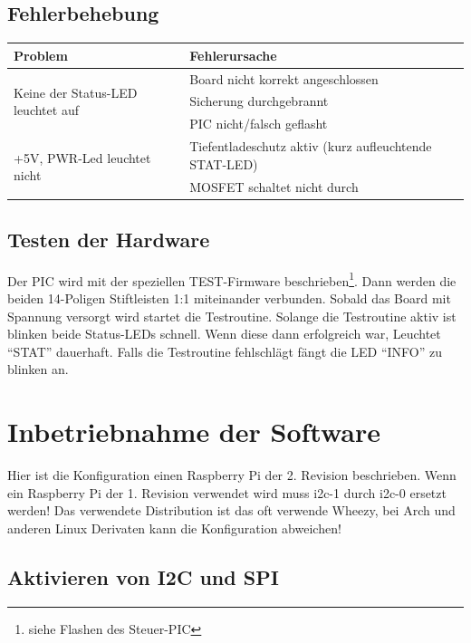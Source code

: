 \documentclass[a4paper,10pt]{article}
\begin{document}
\subsection{Fehlerbehebung}

\begin{center}
    \begin{tabular}{| l | p{6cm} |}
    \hline
    Problem 							& Fehlerursache \\ \hline
    \multirow{3}{*}{Keine der Status-LED leuchtet auf}
	& Board nicht korrekt angeschlossen \\ \cline{2-2}
	& Sicherung durchgebrannt \\ \cline{2-2}
	& PIC nicht/falsch geflasht \\
    \hline
    \multirow{2}{*}{+5V, PWR-Led leuchtet nicht}
	& Tiefentladeschutz aktiv (kurz aufleuchtende STAT-LED) \\ \cline{2-2}
	& MOSFET schaltet nicht durch \\
    \hline
    \end{tabular}
\end{center}

\subsection{Testen der Hardware}

Der PIC wird mit der speziellen TEST-Firmware beschrieben\footnote{siehe Flashen des Steuer-PIC}. Dann werden die beiden 14-Poligen Stiftleisten 1:1 miteinander verbunden. Sobald das Board mit Spannung versorgt wird startet die Testroutine. Solange die Testroutine aktiv ist blinken beide Status-LEDs schnell. Wenn diese dann erfolgreich war, Leuchtet ``STAT'' dauerhaft. Falls die Testroutine fehlschlägt fängt die LED ``INFO'' zu blinken an.

\newpage

\section{Inbetriebnahme der Software}

Hier ist die Konfiguration einen Raspberry Pi der 2. Revision beschrieben. Wenn ein Raspberry Pi der 1. Revision verwendet wird muss i2c-1 durch i2c-0 ersetzt werden! Das verwendete Distribution ist das oft verwende Wheezy, bei Arch und anderen Linux Derivaten kann die Konfiguration abweichen!

\subsection{Aktivieren von I2C und SPI}
\end{document}
